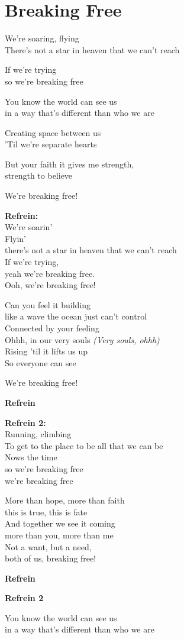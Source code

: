 \section{Breaking Free}
We're soaring, flying\\
There's not a star in heaven that we can’t reach

If we're trying\\
so we're breaking free

You know the world can see us\\
in a way that's different than who we are

Creating space between us\\
'Til we're separate hearts

But your faith it gives me strength,\\
strength to believe

We're breaking free!

\textbf{Refrein:}\\
We're soarin'\\
Flyin'\\
there's not a star in heaven that we can’t reach\\
If we're trying,\\
yeah we're breaking free.\\
Ooh, we're breaking free!

Can you feel it building\\
like a wave the ocean just can’t control\\
Connected by your feeling\\
Ohhh, in our very souls \textit{(Very souls, ohhh)}\\
Rising 'til it lifts us up\\
So everyone can see

We're breaking free!

\textbf{Refrein}

\textbf{Refrein 2:}\\
Running, climbing\\
To get to the place to be all that we can be\\
Nows the time\\
so we're breaking free\\
we're breaking free

More than hope, more than faith\\
this is true, this is fate\\
And together we see it coming\\
more than you, more than me\\
Not a want, but a need,\\
both of us, breaking free!

\textbf{Refrein}

\textbf{Refrein 2}

You know the world can see us\\
in a way that's different than who we are
